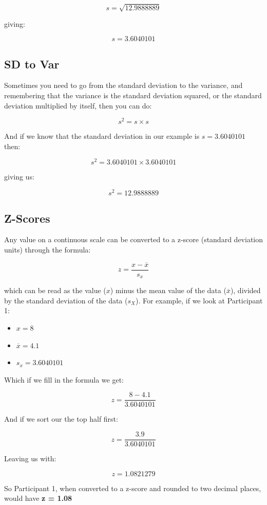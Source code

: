 \documentclass[
  oneside]{book}
\providecommand{\tightlist}{%
  \setlength{\itemsep}{0pt}\setlength{\parskip}{0pt}}
\begin{document}
\[s = \sqrt{12.9888889}\]

giving:

\[s = 3.6040101\]

\hypertarget{sd-to-var}{%
\subsection{SD to Var}\label{sd-to-var}}

Sometimes you need to go from the standard deviation to the variance, and remembering that the variance is the standard deviation squared, or the standard deviation multiplied by itself, then you can do:

\[s^2 = s \times s\]

And if we know that the standard deviation in our example is \(s = 3.6040101\) then:

\[s^2 = 3.6040101 \times 3.6040101\]

giving us:

\[s^2 = 12.9888889\]

\hypertarget{z-scores}{%
\subsection{Z-Scores}\label{z-scores}}

Any value on a continuous scale can be converted to a z-score (standard deviation units) through the formula:

\[z = \frac{x - \overline{x}}{s_{x}}\]

which can be read as the value (\(x\)) minus the mean value of the data (\(\overline{x}\)), divided by the standard deviation of the data (\(s_{X}\)). For example, if we look at Participant 1:

\begin{itemize}
\tightlist
\item
  \(x = 8\)
\item
  \(\overline{x} = 4.1\)
\item
  \(s_{x} = 3.6040101\)
\end{itemize}

Which if we fill in the formula we get:

\[z = \frac{8 - 4.1}{3.6040101}\]

And if we sort our the top half first:

\[z = \frac{3.9}{3.6040101}\]

Leaving us with:

\[z = 1.0821279\]

So Participant 1, when converted to a z-score and rounded to two decimal places, would have \textbf{z = 1.08}
\end{document}
